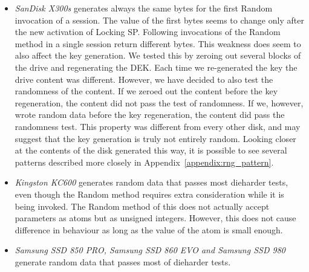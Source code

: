 \begin{itemize}
    \item \emph{SanDisk X300s} generates always the same bytes for the first Random invocation of a session. The value of the first bytes seems to change only after the new activation of Locking SP. Following invocations of the Random method in a single session return different bytes. This weakness does seem to also affect the key generation. We tested this by zeroing out several blocks of the drive and regenerating the DEK. Each time we re-generated the key the drive content was different. However, we have decided to also test the randomness of the content. If we zeroed out the content before the key regeneration, the content did not pass the test of randomness. If we, however, wrote random data before the key regeneration, the content did pass the randomness test. This property was different from every other disk, and may suggest that the key generation is truly not entirely random. Looking closer at the contents of the disk generated this way, it is possible to see several patterns described more closely in Appendix~\ref{appendix:rng_pattern}.%
    \item \emph{Kingston KC600} generates random data that passes most dieharder tests, even though the Random method requires extra consideration while it is being invoked. The Random method of this does not actually accept parameters as atoms but as unsigned integers. However, this does not cause difference in behaviour as long as the value of the atom is small enough.  %
    \item \emph{Samsung SSD 850 PRO, Samsung SSD 860 EVO and Samsung SSD 980} generate random data that passes most of dieharder tests. %
\end{itemize}
